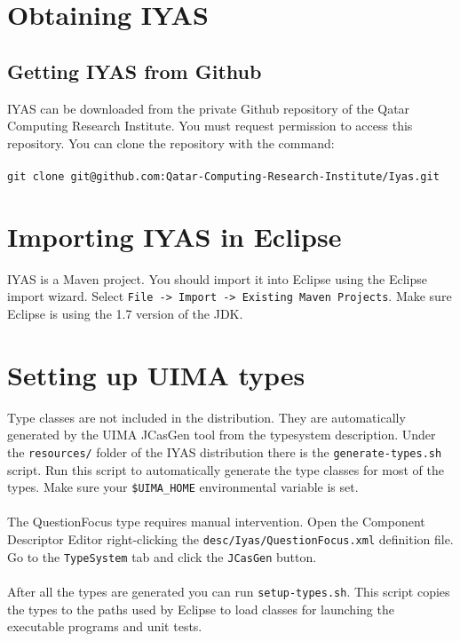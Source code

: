 \documentclass{wileysev}
\begin{document}
\section[Obtaining IYAS]{Obtaining IYAS}

\subsection[Getting IYAS from Github]{Getting IYAS from Github}

IYAS can be downloaded from the private Github repository of the Qatar Computing Research Institute. You must request permission to access this repository. You can clone the repository with the command:\\\\
\texttt{\small git clone git@github.com:Qatar-Computing-Research-Institute/Iyas.git}

\section[Importing IYAS in Eclipse]{Importing IYAS in Eclipse}
IYAS is a Maven project. You should import it into Eclipse using the Eclipse import wizard. Select \texttt{File -> Import -> Existing Maven Projects}. Make sure Eclipse is using the 1.7 version of the JDK.

\section[Setting up UIMA types]{Setting up UIMA types}
Type classes are not included in the distribution. They are automatically generated by the UIMA JCasGen tool from the typesystem description. Under the \texttt{resources/} folder of the IYAS distribution there is the \texttt{generate-types.sh} script. Run this script to automatically generate the type classes for most of the types. Make sure your \texttt{\$UIMA\_HOME} environmental variable is set.
\\\\
The QuestionFocus type requires manual intervention. Open the Component Descriptor Editor right-clicking the \texttt{desc/Iyas/QuestionFocus.xml} definition file. Go to the \texttt{TypeSystem} tab and click the \texttt{JCasGen} button.
\\\\
After all the types are generated you can run \texttt{setup-types.sh}. This script copies the types to the paths used by Eclipse to load classes for launching the executable programs and unit tests. 
\end{document}
